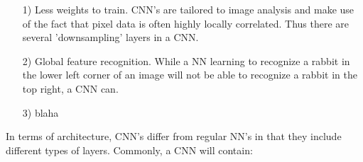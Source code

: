 \documentclass[]{article}
\begin{document}
\begin{itemize}
	\item[1)] Less weights to train. CNN's are tailored to image analysis and make use of the fact that pixel data is often highly locally correlated. Thus there are several 'downsampling' layers in a CNN.
	
	\item[2)] Global feature recognition. While a NN learning to recognize a rabbit in the lower left corner of an image will not be able to recognize a rabbit in the top right, a CNN can.
	
	\item[3)] blaha
\end{itemize}

In terms of architecture, CNN's differ from regular NN's in that they include different types of layers. Commonly, a CNN will contain:
\end{document}
